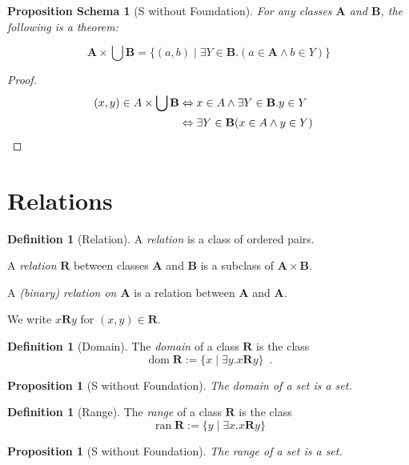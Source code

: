 \documentclass{book}
\let\qed\relax
\newtheorem{prop}[ax]{Proposition}
\newtheorem{props}[ax]{Proposition Schema}
\theoremstyle{definition}
\newtheorem{df}[ax]{Definition}
\newcommand{\dom}{\ensuremath{\operatorname{dom}}}
\newcommand{\ran}{\ensuremath{\operatorname{ran}}}
\begin{document}
\begin{props}[S without Foundation]
For any classes $\mathbf{A}$ and $\mathbf{B}$, the following is a theorem:

\[ \mathbf{A} \times \bigcup \mathbf{B} = \{ (a,b) \mid \exists Y \in \mathbf{B}. (a \in \mathbf{A} \wedge b \in Y) \} \]
\end{props}

\begin{proof}
\pf
\begin{align*}
(x,y) \in A \times \bigcup \mathbf{B} & \Leftrightarrow x \in A \wedge \exists Y \in \mathbf{B}. y \in Y \\
& \Leftrightarrow \exists Y \in \mathbf{B} (x \in A \wedge y \in Y) & \qed
\end{align*}
\end{proof}

\section{Relations}

\begin{df}[Relation]
A \emph{relation} is a class of ordered pairs.

A \emph{relation} $\mathbf{R}$ between classes $\mathbf{A}$ and $\mathbf{B}$ is a subclass of $\mathbf{A} \times \mathbf{B}$.

A \emph{(binary) relation on $\mathbf{A}$} is a relation between $\mathbf{A}$ and $\mathbf{A}$.

We write $x \mathbf{R} y$ for $(x,y) \in \mathbf{R}$.
\end{df}

\begin{df}[Domain]
The \emph{domain} of a class $\mathbf{R}$ is the class
\[ \dom \mathbf{R} := \{ x \mid \exists y. x \mathbf{R} y \} \enspace . \]
\end{df}

\begin{prop}[S without Foundation]
The domain of a set is a set.
\end{prop}

\begin{df}[Range]
The \emph{range} of a class $\mathbf{R}$ is the class
\[ \ran \mathbf{R} := \{ y \mid \exists x. x \mathbf{R} y \} \]
\end{df}

\begin{prop}[S without Foundation]
The range of a set is a set.
\end{prop}
\end{document}
